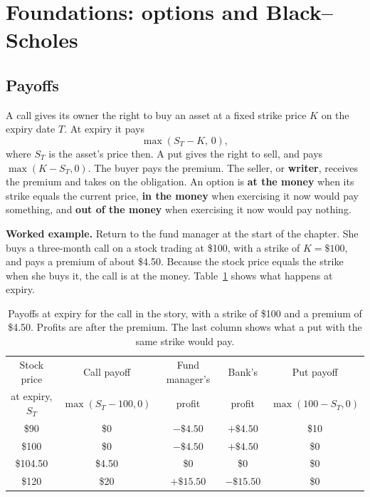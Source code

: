 \section{Foundations: options and Black--Scholes}
\label{sec:14-foundations}

\subsection{Payoffs}

A call gives its owner the right to buy an asset at a fixed strike price $K$ on the expiry date $T$. At expiry it pays
\begin{equation}
  \max(S_T - K,\, 0),
  \label{eq:14-call-payoff}
\end{equation}
where $S_T$ is the asset's price then. A put gives the right to sell, and pays $\max(K - S_T, 0)$. The buyer pays the premium. The seller, or \textbf{writer}, receives the premium and takes on the obligation. An option is \textbf{at the money} when its strike equals the current price, \textbf{in the money} when exercising it now would pay something, and \textbf{out of the money} when exercising it now would pay nothing.


\textbf{Worked example.} Return to the fund manager at the start of the chapter. She buys a three-month call on a stock trading at \$100, with a strike of $K = \$100$, and pays a premium of about \$4.50. Because the stock price equals the strike when she buys it, the call is at the money. Table~\ref{tab:14-payoff} shows what happens at expiry.

\begin{table}[htbp]
\centering
\caption{Payoffs at expiry for the call in the story, with a strike of \$100 and a premium of \$4.50. Profits are after the premium. The last column shows what a put with the same strike would pay.}
\label{tab:14-payoff}
\begin{tabular}{@{}ccccc@{}}
\toprule
Stock price & Call payoff & Fund manager's & Bank's & Put payoff \\
at expiry, $S_T$ & $\max(S_T - 100, 0)$ & profit & profit & $\max(100 - S_T, 0)$ \\
\midrule
\$90     & \$0     & $-\$4.50$  & $+\$4.50$  & \$10 \\
\$100    & \$0     & $-\$4.50$  & $+\$4.50$  & \$0 \\
\$104.50 & \$4.50  & \$0        & \$0        & \$0 \\
\$120    & \$20    & $+\$15.50$ & $-\$15.50$ & \$0 \\
\bottomrule
\end{tabular}
\end{table}

